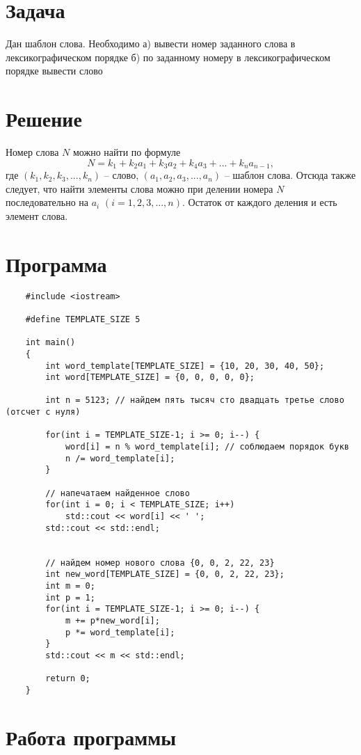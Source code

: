 \documentclass{article}
\begin{document}
  \section{Задача}
    Дан шаблон слова. Необходимо \newline
    а) вывести номер заданного слова в лексикографическом порядке \newline
    б) по заданному номеру в лексикографическом порядке вывести слово

  \section{Решение}
    Номер слова $N$ можно найти по формуле
    $$ N = k_1 + k_2 a_1 + k_3 a_2 + k_4 a_3 + ... + k_n a_{n-1}, $$ где
    $(k_1, k_2, k_3, ..., k_n)$ -- слово,
    $(a_1, a_2, a_3, ..., a_n)$ -- шаблон слова. \newline
    Отсюда также следует, что найти элементы слова можно
    при делении номера $N$ последовательно на $a_i$ $(i = 1, 2, 3, ..., n)$.
    Остаток от каждого деления и есть элемент слова.

  \pagebreak
  \section{Программа}
    \begin{verbatim}
    #include <iostream>
    
    #define TEMPLATE_SIZE 5
    
    int main()
    {
        int word_template[TEMPLATE_SIZE] = {10, 20, 30, 40, 50};
        int word[TEMPLATE_SIZE] = {0, 0, 0, 0, 0};
    
        int n = 5123; // найдем пять тысяч сто двадцать третье слово (отсчет с нуля)
        
        for(int i = TEMPLATE_SIZE-1; i >= 0; i--) {
            word[i] = n % word_template[i]; // соблюдаем порядок букв
            n /= word_template[i];
        }
    
        // напечатаем найденное слово
        for(int i = 0; i < TEMPLATE_SIZE; i++)
            std::cout << word[i] << ' ';
        std::cout << std::endl;
    
    
        // найдем номер нового слова {0, 0, 2, 22, 23}
        int new_word[TEMPLATE_SIZE] = {0, 0, 2, 22, 23};
        int m = 0;
        int p = 1;
        for(int i = TEMPLATE_SIZE-1; i >= 0; i--) {
            m += p*new_word[i];
            p *= word_template[i];
        }
        std::cout << m << std::endl;
    
        return 0;
    }
    \end{verbatim}
  \section{Работа программы}
\end{document}
